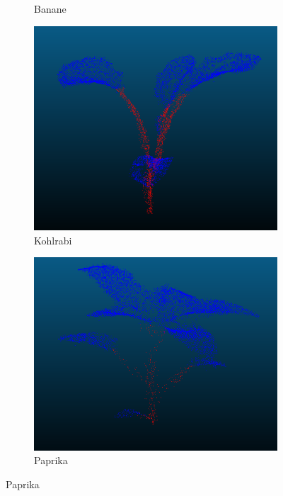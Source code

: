 \documentclass[12pt,titlepage, twoside]{article}
\begin{document}
\begin{figure}[htb]
\begin{subfigure}{0.24\textwidth}
  \caption{Banane}
  \label{fig:segmentation:compare:2}
\end{subfigure}\hfil
\begin{subfigure}{0.24\textwidth}
  \includegraphics[width=\linewidth]{./Images/Plant_Kohlrabi.png}
  \caption{Kohlrabi}
  \label{fig:segmentation:compare:3}
\end{subfigure}\hfil
\begin{subfigure}{0.24\textwidth}
    \includegraphics[width=\linewidth]{./Images/Plant_Paprika.png}
    \caption{Paprika}
    \label{fig:segmentation:compare:4}
  \end{subfigure}


\end{figure}
\end{document}
